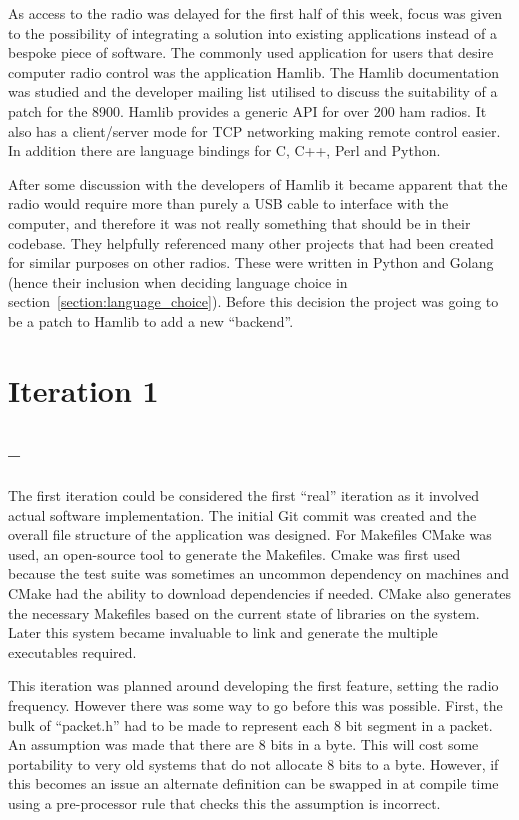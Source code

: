 As access to the radio was delayed for the first half of this week, focus was given to the possibility of integrating a solution into existing applications instead of a bespoke piece of software. The commonly used application for users that desire computer radio control was the application Hamlib\cite{hamlib}. The Hamlib documentation was studied and the developer mailing list utilised to discuss the suitability of a patch for the \gls{8900}. Hamlib provides a generic API for over 200 ham radios. It also has a client/server mode for TCP networking making remote control easier. In addition there are language bindings for C, C++, Perl and Python.

After some discussion with the developers of Hamlib it became apparent that the radio would require more than purely a USB cable to interface with the computer, and therefore it was not really something that should be in their codebase. They helpfully referenced many other projects that had been created for similar purposes on other radios. These were written in Python and Golang (hence their inclusion when deciding language choice in section~\ref{section:language_choice}). Before this decision the project was going to be a patch to Hamlib to add a new ``backend''. 

\section{Iteration 1}
\subsection*{ -- }
The first iteration could be considered the first ``real'' iteration as it involved actual software implementation. The initial Git commit was created and the overall file structure of the application was designed. For Makefiles CMake\cite{cmake} was used, an open-source tool to generate the Makefiles. Cmake was first used because the test suite was sometimes an uncommon dependency on machines and CMake had the ability to download dependencies if needed. CMake also generates the necessary Makefiles based on the current state of libraries on the system. Later this system became invaluable to link and generate the multiple executables required.

This iteration was planned around developing the first feature, setting the radio frequency. However there was some way to go before this was possible. First, the bulk of ``packet.h'' had to be made to represent each 8 bit segment in a packet. An assumption was made that there are 8 bits in a byte. This will cost some portability to very old systems that do not allocate 8 bits to a byte. However, if this becomes an issue an alternate definition can be swapped in at compile time using a pre-processor rule that checks this the assumption is incorrect.

